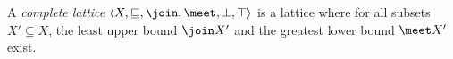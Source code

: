 
A \emph{complete lattice} $\langle X, \sqsubseteq, \join, \meet, \bot, \top \rangle$ is a lattice where for all subsets $X' \subseteq X$, the least upper bound $\join X'$ and the greatest lower bound $\meet X'$ exist.

